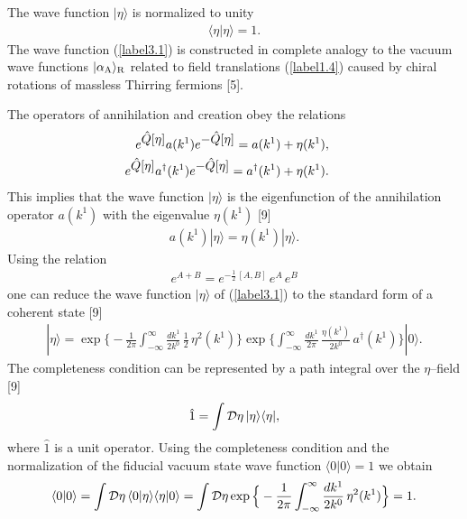 \documentclass[a4paper,12pt] {article}
\begin{document}
The wave function $|\eta\rangle$ is normalized to unity
%
\begin{eqnarray}\label{label3.4}
\langle \eta|\eta \rangle = 1.
\end{eqnarray}
%
The wave function (\ref{label3.1}) is constructed in complete analogy
to the vacuum wave functions $|\alpha_{\rm A}\rangle_{\rm R}$
related to field translations (\ref{label1.4}) caused by chiral
rotations of massless Thirring fermions [5].

The operators of annihilation and creation obey the relations
%
\begin{eqnarray}\label{label3.5}
\hspace{-0.3in}&& e^{\textstyle \hat{Q}[\eta]}a(k^1) e^{\textstyle
-\hat{Q}[\eta]} = a(k^1) + \eta(k^1),\nonumber\\ \hspace{-0.3in}&&
e^{\textstyle \hat{Q}[\eta]}a^{\dagger}(k^1) e^{\textstyle
-\hat{Q}[\eta]} = a^{\dagger}(k^1) + \eta(k^1).
\end{eqnarray}
%
This implies that the wave function $|\eta\rangle$ is the
eigenfunction of the annihilation operator $a(k^1)$ with the
eigenvalue $\eta(k^1)$ [9]
%
\begin{eqnarray}\label{label3.6}
a(k^1)|\eta\rangle = \eta(k^1)|\eta\rangle.
\end{eqnarray}
%
Using the relation
%
\begin{eqnarray}\label{label3.7}
e^{\textstyle A + B} = e^{\textstyle -\frac{1}{2}\,[A,B]}\,e^{\textstyle
A}\,e^{\textstyle B}
\end{eqnarray}
%
one can reduce the wave function $|\eta\rangle$ of (\ref{label3.1}) to
the standard form of a coherent state [9]
%
\begin{eqnarray}\label{label3.8}
|\eta\rangle =
 \exp\Big\{-\frac{1}{2\pi}\int^{\infty}_{-\infty}\frac{dk^1}{2k^0}\,
 \frac{1}{2}\,\eta^2(k^1)\Big\}
 \exp\Big\{\int^{\infty}_{-\infty}\frac{dk^1}{2\pi}\,
 \frac{\eta(k^1)}{2k^0}\,a^{\dagger}(k^1)\Big\}|0\rangle.
\end{eqnarray}
%
The completeness condition can be represented by a path integral over
the $\eta$--field [9]
%
\begin{eqnarray}\label{label3.9}
\hat{1} = \int {\cal D}\eta\,|\eta\rangle\langle \eta|,
\end{eqnarray}
%
where $\hat{1}$ is a unit operator. Using the completeness condition
and the normalization of the fiducial vacuum state wave function
$\langle 0|0\rangle = 1$ we obtain
%
\begin{eqnarray}\label{label3.10}
\langle 0|0\rangle = \int {\cal D}\eta\,\langle 0|\eta\rangle \langle
\eta|0\rangle = \int {\cal D}\eta
\exp\Big\{-\frac{1}{2\pi}\int^{\infty}_{-\infty} \frac{dk^1}{2k^0}\,
\eta^2(k^1)\Big\} = 1.
\end{eqnarray}
\end{document}
